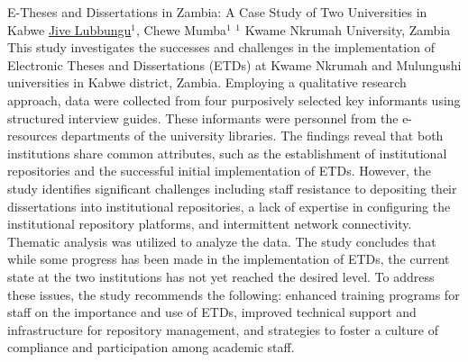 

    \begin{abstract_online}{E-Theses and Dissertations in Zambia: A Case Study of Two Universities in Kabwe}{%
        \underline{Jive Lubbungu}$^{1}$, Chewe Mumba$^{1}${%
        }{%
        $^1$ Kwame Nkrumah University, Zambia}
            }
        This study investigates the successes and challenges in the implementation of Electronic Theses and Dissertations (ETDs) at Kwame Nkrumah and Mulungushi universities in Kabwe district, Zambia. Employing a qualitative research approach, data were collected from four purposively selected key informants using structured interview guides. These informants were personnel from the e-resources departments of the university libraries. The findings reveal that both institutions share common attributes, such as the establishment of institutional repositories and the successful initial implementation of ETDs. However, the study identifies significant challenges including staff resistance to depositing their dissertations into institutional repositories, a lack of expertise in configuring the institutional repository platforms, and intermittent network connectivity. Thematic analysis was utilized to analyze the data. The study concludes that while some progress has been made in the implementation of ETDs, the current state at the two institutions has not yet reached the desired level. To address these issues, the study recommends the following: enhanced training programs for staff on the importance and use of ETDs, improved technical support and infrastructure for repository management, and strategies to foster a culture of compliance and participation among academic staff.

    \end{abstract_online}
